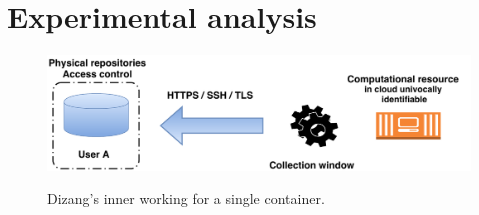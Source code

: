 \documentclass[conference]{IEEEtran}
\newcommand{\marcos}[1]{{\color{green}{MARCOS: #1}}}
\newcommand{\fancyname}{Dizang}
\begin{document}
\section{Experimental analysis}
\label{sec:proposal-impl}

\begin{figure}[htb!]
\footnotesize
\caption{\fancyname's inner working for a single container. 
}
\includegraphics[center,scale=0.45]{solucao-eng-small.pdf}
\centering
\label{fig:Solucao}
\end{figure}
\end{document}
